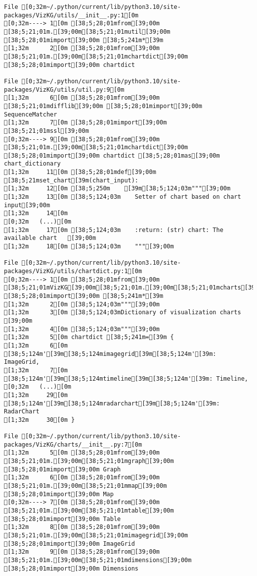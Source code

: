 \documentclass[
  letterpaper,
]{book}
\begin{document}
\begin{verbatim}
File [0;32m~/.python/current/lib/python3.10/site-packages/VizKG/utils/__init__.py:1[0m
[0;32m----> 1[0m [38;5;28;01mfrom[39;00m [38;5;21;01m.[39;00m[38;5;21;01mutil[39;00m [38;5;28;01mimport[39;00m [38;5;241m*[39m
[1;32m      2[0m [38;5;28;01mfrom[39;00m [38;5;21;01m.[39;00m[38;5;21;01mchartdict[39;00m [38;5;28;01mimport[39;00m chartdict

File [0;32m~/.python/current/lib/python3.10/site-packages/VizKG/utils/util.py:9[0m
[1;32m      6[0m [38;5;28;01mfrom[39;00m [38;5;21;01mdifflib[39;00m [38;5;28;01mimport[39;00m SequenceMatcher
[1;32m      7[0m [38;5;28;01mimport[39;00m [38;5;21;01mssl[39;00m
[0;32m----> 9[0m [38;5;28;01mfrom[39;00m [38;5;21;01m.[39;00m[38;5;21;01mchartdict[39;00m [38;5;28;01mimport[39;00m chartdict [38;5;28;01mas[39;00m chart_dictionary
[1;32m     11[0m [38;5;28;01mdef[39;00m [38;5;21mset_chart[39m(chart_input):
[1;32m     12[0m [38;5;250m    [39m[38;5;124;03m"""[39;00m
[1;32m     13[0m [38;5;124;03m    Setter of chart based on chart input[39;00m
[1;32m     14[0m 
[0;32m   (...)[0m
[1;32m     17[0m [38;5;124;03m    :return: (str) chart: The available chart   [39;00m
[1;32m     18[0m [38;5;124;03m    """[39;00m

File [0;32m~/.python/current/lib/python3.10/site-packages/VizKG/utils/chartdict.py:1[0m
[0;32m----> 1[0m [38;5;28;01mfrom[39;00m [38;5;21;01mVizKG[39;00m[38;5;21;01m.[39;00m[38;5;21;01mcharts[39;00m [38;5;28;01mimport[39;00m [38;5;241m*[39m
[1;32m      2[0m [38;5;124;03m"""[39;00m
[1;32m      3[0m [38;5;124;03mDictionary of visualization charts [39;00m
[1;32m      4[0m [38;5;124;03m"""[39;00m
[1;32m      5[0m chartdict [38;5;241m=[39m {
[1;32m      6[0m     [38;5;124m'[39m[38;5;124mimagegrid[39m[38;5;124m'[39m: ImageGrid,
[1;32m      7[0m     [38;5;124m'[39m[38;5;124mtimeline[39m[38;5;124m'[39m: Timeline,
[0;32m   (...)[0m
[1;32m     29[0m     [38;5;124m'[39m[38;5;124mradarchart[39m[38;5;124m'[39m: RadarChart
[1;32m     30[0m }

File [0;32m~/.python/current/lib/python3.10/site-packages/VizKG/charts/__init__.py:7[0m
[1;32m      5[0m [38;5;28;01mfrom[39;00m [38;5;21;01m.[39;00m[38;5;21;01mgraph[39;00m [38;5;28;01mimport[39;00m Graph
[1;32m      6[0m [38;5;28;01mfrom[39;00m [38;5;21;01m.[39;00m[38;5;21;01mmap[39;00m [38;5;28;01mimport[39;00m Map
[0;32m----> 7[0m [38;5;28;01mfrom[39;00m [38;5;21;01m.[39;00m[38;5;21;01mtable[39;00m [38;5;28;01mimport[39;00m Table
[1;32m      8[0m [38;5;28;01mfrom[39;00m [38;5;21;01m.[39;00m[38;5;21;01mimagegrid[39;00m [38;5;28;01mimport[39;00m ImageGrid
[1;32m      9[0m [38;5;28;01mfrom[39;00m [38;5;21;01m.[39;00m[38;5;21;01mdimensions[39;00m [38;5;28;01mimport[39;00m Dimensions


\end{verbatim}
\end{document}
